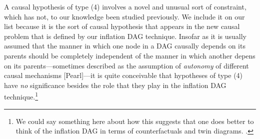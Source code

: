 A causal hypothesis of type (4) involves a novel and unusual sort of constraint, which has not, to our knowledge been studied previously.  We include it on our list because it is the sort of causal hypothesis that appears in the new causal problem that is defined by our inflation DAG technique.  Insofar as it is usually assumed that the manner in which one node in a DAG causally depends on its parents should be completely independent of the manner in which another depens on its parents---sometimes described as the assumption of {\em autonomy} of different causal mechanisms [Pearl]---it is quite conceivable that hypotheses of type (4) have {\em no} significance besides the role that they play in the inflation DAG technique.\footnote{\color{red} We could say something here about how this suggests that one does better to think of the inflation DAG in terms of counterfactuals and twin diagrams. \color{black}.}




